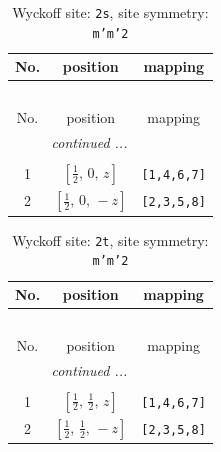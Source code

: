 \documentclass[fleqn,8pt]{jsarticle}
\begin{document}
\renewcommand{\arraystretch}{1.2}
\begin{longtable}{ccc}
\caption{Wyckoff site: {\tt 2s}, site symmetry: {\tt m'm'2}}
 \\
 \hline \hline
No. & position & mapping \\ \hline \endfirsthead

\multicolumn{2}{l}{\tablename\ \thetable{}} \\
 \hline \hline
No. & position & mapping \\ \hline \endhead

 \hline \hline
\multicolumn{2}{r}{\footnotesize\it continued ...} \\ \endfoot

 \hline \hline
\multicolumn{2}{r}{} \\ \endlastfoot

1 & $\left[ \frac{1}{2},\, 0,\, z \right]$ & {\tt [1,4,6,7]} \\ \hline
2 & $\left[ \frac{1}{2},\, 0,\, - z \right]$ & {\tt [2,3,5,8]} \\
\end{longtable}
\renewcommand{\arraystretch}{1.2}
\begin{longtable}{ccc}
\caption{Wyckoff site: {\tt 2t}, site symmetry: {\tt m'm'2}}
 \\
 \hline \hline
No. & position & mapping \\ \hline \endfirsthead

\multicolumn{2}{l}{\tablename\ \thetable{}} \\
 \hline \hline
No. & position & mapping \\ \hline \endhead

 \hline \hline
\multicolumn{2}{r}{\footnotesize\it continued ...} \\ \endfoot

 \hline \hline
\multicolumn{2}{r}{} \\ \endlastfoot

1 & $\left[ \frac{1}{2},\, \frac{1}{2},\, z \right]$ & {\tt [1,4,6,7]} \\ \hline
2 & $\left[ \frac{1}{2},\, \frac{1}{2},\, - z \right]$ & {\tt [2,3,5,8]} \\
\end{longtable}
\renewcommand{\arraystretch}{1.2}
\end{document}

